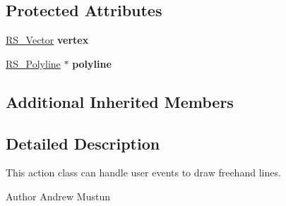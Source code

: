 \subsection*{Protected Attributes}
\begin{DoxyCompactItemize}
\item 
\hypertarget{classRS__ActionDrawLineFree_a76d6db6b37ef36e197787affdd5f6212}{\hyperlink{classRS__Vector}{R\-S\-\_\-\-Vector} {\bfseries vertex}}\label{classRS__ActionDrawLineFree_a76d6db6b37ef36e197787affdd5f6212}

\item 
\hypertarget{classRS__ActionDrawLineFree_a62e9fab3432344f9783bcf0935e98bfd}{\hyperlink{classRS__Polyline}{R\-S\-\_\-\-Polyline} $\ast$ {\bfseries polyline}}\label{classRS__ActionDrawLineFree_a62e9fab3432344f9783bcf0935e98bfd}

\end{DoxyCompactItemize}
\subsection*{Additional Inherited Members}


\subsection{Detailed Description}
This action class can handle user events to draw freehand lines.

\begin{DoxyAuthor}{Author}
Andrew Mustun 
\end{DoxyAuthor}


